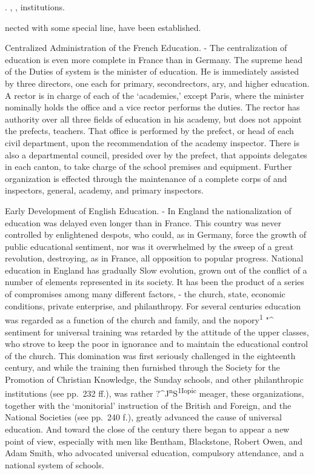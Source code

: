 \documentclass[]{book}
\begin{document}
. , , institutions.

nected with some special line, have been established.

Centralized Administration of the French Education. - The centralization of education is even more complete in France than in Germany. The supreme head of the\protect\hypertarget{ch25.xmlux5cux23para.463.1.0.box.95.217.1263.802.q.60}{}{ Duties of system is the minister of education. He is immediately assisted by three directors, one each for primary, secondrectors, ary, and higher education. A rector is in charge of each of the `academies,' except Paris, where the minister nominally holds the office and a vice rector performs the duties. The rector has authority over all three fields of education in his academy, but does not appoint the prefects, teachers. That office is performed by the prefect, or head of each civil department, upon the recommendation of the academy inspector. There is also a departmental council, presided over by the prefect, that appoints delegates in each canton, to take charge of the school premises and equipment. Further organization is effected through the maintenance of a complete corps of and inspectors, general, academy, and primary inspectors.}

Early Development of English Education. - In England the nationalization of education was delayed even longer than in France. This country was never controlled by enlightened despots, who could, as in Germany, force the growth of public educational sentiment, nor was it overwhelmed by the sweep of a great revolution, destroying, as in France, all opposition to popular progress. National education in England has gradually Slow evolution, grown out of the conflict of a number of elements represented in its society. It has been the product of a series of compromises among many different factors, - the church, state, economic conditions, private enterprise, and philanthropy. For several centuries education was regarded as a function of the church and family, and the nopory\textsuperscript{1} "\^{} sentiment for universal training was retarded by the attitude of the upper classes, who strove to keep the poor in ignorance and to maintain the educational control\protect\hypertarget{ch25.xmlux5cux23para.464.1.0.box.98.226.1243.738.q.60}{}{ of the church. This domination was first seriously challenged in the eighteenth century, and while the training then furnished through the Society for the Promotion of Christian Knowledge, the Sunday schools, and other philanthropic institutions (see pp.~232 ff.), was rather ?\^{}J\textsuperscript{n}S\textsuperscript{1Iopic} meager, these organizations, together with the `monitorial' instruction of the British and Foreign, and the National Societies (see pp.~240 f.), greatly advanced the cause of universal education. And toward the close of the century there began to appear a new point of view, especially with men like Bentham, Blackstone, Robert Owen, and Adam Smith, who advocated universal education, compulsory attendance, and a national system of schools.}
\end{document}
